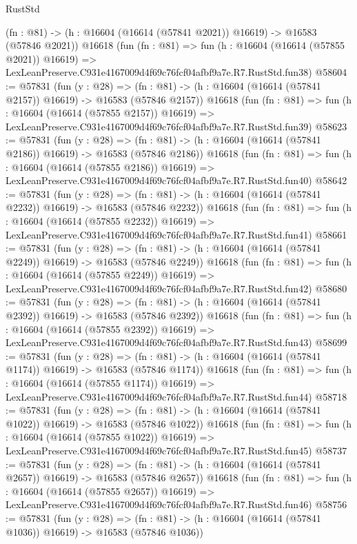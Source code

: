 \begin{lexlean}{RustStd}
\begin{coremodule}
    (fn : @81) -> (h : @16604 (@16614 (@57841 @2021)) @16619) -> @16583 (@57846 @2021))
    @16618
    (fun (fn : @81) =>
    fun (h : @16604 (@16614 (@57855 @2021)) @16619) =>
    LexLeanPreserve.C931e4167009d4f69c76fcf04afbf9a7e.R7.RustStd.fun38)
@58604 := @57831
    (fun (y : @28) =>
    (fn : @81) -> (h : @16604 (@16614 (@57841 @2157)) @16619) -> @16583 (@57846 @2157))
    @16618
    (fun (fn : @81) =>
    fun (h : @16604 (@16614 (@57855 @2157)) @16619) =>
    LexLeanPreserve.C931e4167009d4f69c76fcf04afbf9a7e.R7.RustStd.fun39)
@58623 := @57831
    (fun (y : @28) =>
    (fn : @81) -> (h : @16604 (@16614 (@57841 @2186)) @16619) -> @16583 (@57846 @2186))
    @16618
    (fun (fn : @81) =>
    fun (h : @16604 (@16614 (@57855 @2186)) @16619) =>
    LexLeanPreserve.C931e4167009d4f69c76fcf04afbf9a7e.R7.RustStd.fun40)
@58642 := @57831
    (fun (y : @28) =>
    (fn : @81) -> (h : @16604 (@16614 (@57841 @2232)) @16619) -> @16583 (@57846 @2232))
    @16618
    (fun (fn : @81) =>
    fun (h : @16604 (@16614 (@57855 @2232)) @16619) =>
    LexLeanPreserve.C931e4167009d4f69c76fcf04afbf9a7e.R7.RustStd.fun41)
@58661 := @57831
    (fun (y : @28) =>
    (fn : @81) -> (h : @16604 (@16614 (@57841 @2249)) @16619) -> @16583 (@57846 @2249))
    @16618
    (fun (fn : @81) =>
    fun (h : @16604 (@16614 (@57855 @2249)) @16619) =>
    LexLeanPreserve.C931e4167009d4f69c76fcf04afbf9a7e.R7.RustStd.fun42)
@58680 := @57831
    (fun (y : @28) =>
    (fn : @81) -> (h : @16604 (@16614 (@57841 @2392)) @16619) -> @16583 (@57846 @2392))
    @16618
    (fun (fn : @81) =>
    fun (h : @16604 (@16614 (@57855 @2392)) @16619) =>
    LexLeanPreserve.C931e4167009d4f69c76fcf04afbf9a7e.R7.RustStd.fun43)
@58699 := @57831
    (fun (y : @28) =>
    (fn : @81) -> (h : @16604 (@16614 (@57841 @1174)) @16619) -> @16583 (@57846 @1174))
    @16618
    (fun (fn : @81) =>
    fun (h : @16604 (@16614 (@57855 @1174)) @16619) =>
    LexLeanPreserve.C931e4167009d4f69c76fcf04afbf9a7e.R7.RustStd.fun44)
@58718 := @57831
    (fun (y : @28) =>
    (fn : @81) -> (h : @16604 (@16614 (@57841 @1022)) @16619) -> @16583 (@57846 @1022))
    @16618
    (fun (fn : @81) =>
    fun (h : @16604 (@16614 (@57855 @1022)) @16619) =>
    LexLeanPreserve.C931e4167009d4f69c76fcf04afbf9a7e.R7.RustStd.fun45)
@58737 := @57831
    (fun (y : @28) =>
    (fn : @81) -> (h : @16604 (@16614 (@57841 @2657)) @16619) -> @16583 (@57846 @2657))
    @16618
    (fun (fn : @81) =>
    fun (h : @16604 (@16614 (@57855 @2657)) @16619) =>
    LexLeanPreserve.C931e4167009d4f69c76fcf04afbf9a7e.R7.RustStd.fun46)
@58756 := @57831
    (fun (y : @28) =>
    (fn : @81) -> (h : @16604 (@16614 (@57841 @1036)) @16619) -> @16583 (@57846 @1036))

\end{coremodule}
\end{lexlean}
